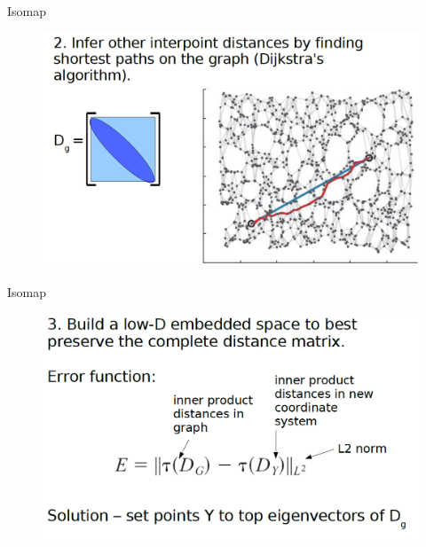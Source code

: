 \documentclass{beamer}
\theoremstyle{plain}
\theoremstyle{definition}
\theoremstyle{plain}
\theoremstyle{plain}
\begin{document}
\begin{frame}{Isomap}
\begin{figure}[ht]
\begin{center}
\includegraphics[width=\textwidth]{./figures/ISO_2.png}
\end{center}
\end{figure}
\end{frame}
\begin{frame}{Isomap}
\begin{figure}[ht]
\begin{center}
\includegraphics[width=\textwidth]{./figures/ISO_3.png}
\end{center}
\end{figure}
\end{frame}
\end{document}
